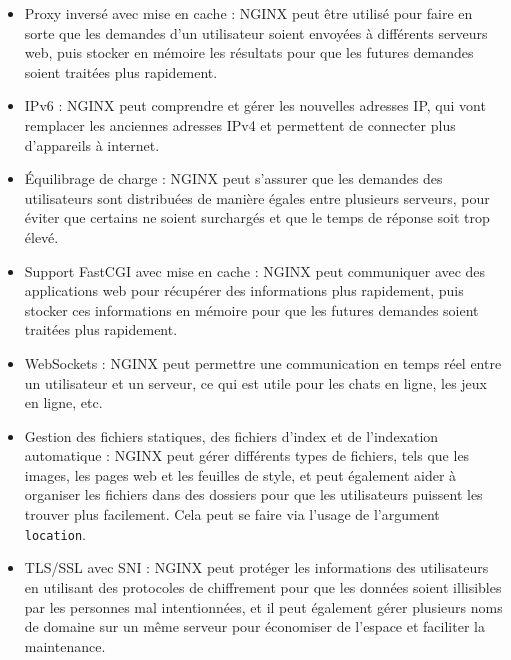 \documentclass{article}
\begin{document}
\begin{itemize}

    \item Proxy inversé avec mise en cache : NGINX peut être utilisé pour faire en sorte que les demandes d'un utilisateur soient envoyées à différents serveurs web, puis stocker en mémoire les résultats pour que les futures demandes soient traitées plus rapidement.

    \item IPv6 : NGINX peut comprendre et gérer les nouvelles adresses IP, qui vont remplacer les anciennes adresses IPv4 et permettent de connecter plus d'appareils à internet.
    
    \item Équilibrage de charge : NGINX peut s'assurer que les demandes des utilisateurs sont distribuées de manière égales entre plusieurs serveurs, pour éviter que certains ne soient surchargés et que le temps de réponse soit trop élevé.
    
    \item Support FastCGI avec mise en cache : NGINX peut communiquer avec des applications web pour récupérer des informations plus rapidement, puis stocker ces informations en mémoire pour que les futures demandes soient traitées plus rapidement.
    
    \item WebSockets : NGINX peut permettre une communication en temps réel entre un utilisateur et un serveur, ce qui est utile pour les chats en ligne, les jeux en ligne, etc.
    
    \item Gestion des fichiers statiques, des fichiers d'index et de l'indexation automatique : NGINX peut gérer différents types de fichiers, tels que les images, les pages web et les feuilles de style, et peut également aider à organiser les fichiers dans des dossiers pour que les utilisateurs puissent les trouver plus facilement. Cela peut se faire via l'usage de l'argument \texttt{location}. 
    
    \item TLS/SSL avec SNI : NGINX peut protéger les informations des utilisateurs en utilisant des protocoles de chiffrement pour que les données soient illisibles par les personnes mal intentionnées, et il peut également gérer plusieurs noms de domaine sur un même serveur pour économiser de l'espace et faciliter la maintenance.

\end{itemize}
\end{document}
